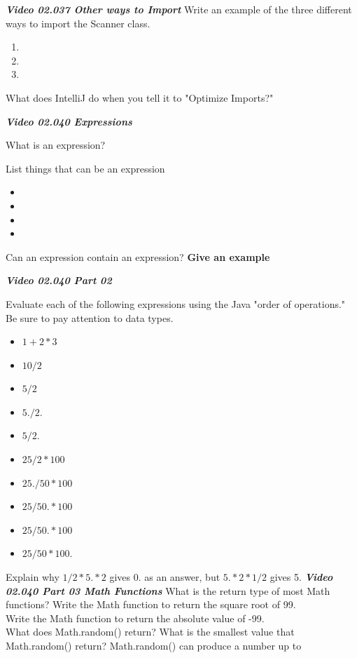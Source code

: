 \documentclass[letterpaper,11pt]{exam}
\newcommand{\videoheading}[1]{\Large\textbf{\textit{#1}}}
\begin{document}
\begin{questions}
\begin{samepage}
\videoheading{Video 02.037 Other ways to Import}
\question Write an example of the three different ways to import the Scanner class.
\begin{enumerate}
  \item
  \item
  \item
\end{enumerate}
\end{samepage}
\question What does IntelliJ do when you tell it to "Optimize Imports?"
\vspace{1cm}

\videoheading{Video 02.040 Expressions}

\question What is an expression?
\begin{samepage}
\question List things that can be an expression
\begin{itemize}
  \item 
  \item 
  \item 
  \item 
\end{itemize}
\end{samepage}
\question Can an expression contain an expression?  \textbf{Give an example}


\videoheading{Video 02.040 Part 02}
\begin{samepage}
\question Evaluate each of the following expressions using the Java "order of operations."  Be sure to pay attention to data types.
\begin{itemize}
  \item$1+2*3$
  \item$10/2$
  \item $5/2$
  \item $5./2.$
  \item $5/2.$
  \item $25/2*100$
  \item $25./50*100$
  \item $25/50.*100$
  \item $25/50.*100$
  \item $25/50*100.$
\end{itemize}
\end{samepage}
\question Explain why $1/2 * 5. * 2$ gives 0. as an answer, but $5. * 2 * 1/2$ gives 5.
\vspace{1cm}
\videoheading{Video 02.040 Part 03 Math Functions}
\question What is the return type of most Math functions?
\question Write the Math function to return the square root of 99.
\\
\question Write the Math function to return the absolute value of -99.
\\
\question What does Math.random() return?
\question What is the smallest value that Math.random() return?
\question Math.random() can produce a number up to \hrulefill


\end{questions}
\end{document}
